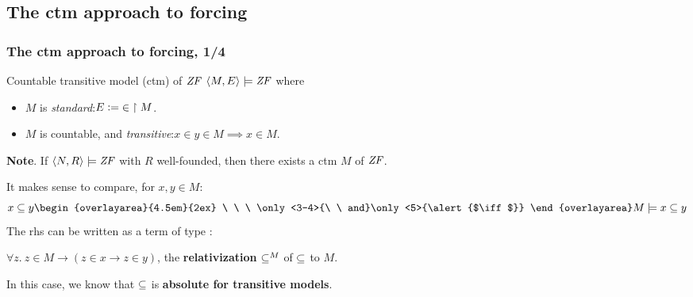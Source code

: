 \documentclass[english]{beamer}
\begin{document}
\subsection{The ctm approach to forcing}

\begin{frame}
  \frametitle{The ctm approach to forcing, 1/4}
  \begin{block}{Countable transitive model (ctm) of $\mathit{ZF}$}
    $\langle M, E\rangle \models \mathit{ZF}$ where
    \begin{itemize}
    \item \alert<3>{$M$ is \emph{standard}:\quad $E \mathrel{\mathop:}= {\in}\restriction M$.}
    \item $M$ is countable, and \emph{transitive}:\quad $x\in y \in M \implies x\in M$.
    \end{itemize}
  \end{block}
  \pause%
  \textbf{Note}. If $\langle N, R\rangle \models \mathit{ZF}$ with $R$ well-founded, then there
  exists a ctm $M$ of $\mathit{ZF}$.
  \pause

  It makes sense to compare, for $x,y\in M$:
  \[
  x \sbq y
  \begin{overlayarea}{4.5em}{2ex}
    \ \ \ \only<3-4>{\ \  and}\only<5>{\alert{$\iff$}}
  \end{overlayarea}
  M \models x\sbq y
  \]
  \pause
  The rhs can be written as a term of type :

  {} \hfill   $\forall z.\ z\in M \longrightarrow (z\in x \longrightarrow z\in
  y)$,
  \hfill the \textbf{relativization} $\subseteq^M$ of $\subseteq$ to $M$. 
  \pause

  In this case, we know that  $\subseteq$  is \textbf{absolute for
    transitive models}.
\end{frame}
\end{document}
